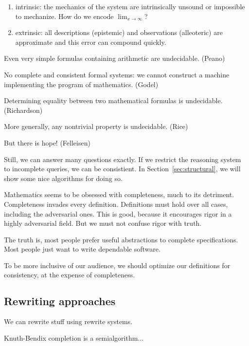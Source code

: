 \documentclass[11pt]{article}
\begin{document}
    \begin{enumerate}
        \item intrinsic: the mechanics of the system are intrinsically unsound or impossible to mechanize. How do we encode $\lim_{x \rightarrow \infty}$?
        \item extrinsic: all descriptions (epistemic) and observations (alleoteric) are approximate and this error can compound quickly.
    \end{enumerate}

    Even very simple formulas containing arithmetic are undecidable. (Peano)

    No complete and consistent formal systems: we cannot construct a machine implementing the program of mathematics. (Godel)

    Determining equality between two mathematical formulas is undecidable. (Richardson)

    More generally, any nontrivial property is undecidable. (Rice)

    But there is hope! (Felleisen)


    Still, we can answer many questions exactly. If we restrict the reasoning system to incomplete queries, we can be consistient. In Section~\ref{sec:structural}, we will show some nice algorithms for doing so.

    Mathematics seems to be obsessed with completeness, much to its detriment. Completeness invades every definition. Definitions must hold over all cases, including the adversarial ones. This is good, because it encourages rigor in a highly adversarial field. But we must not confuse rigor with truth.

    The truth is, most people prefer useful abstractions to complete specifications. Most people just want to write dependable software.

    To be more inclusive of our audience, we should optimize our definitions for consistency, at the expense of completeness.

    \subsection{Rewriting approaches}

    We can rewrite stuff using rewrite systems.

    Knuth-Bendix completion is a semialgorithm...
\end{document}
